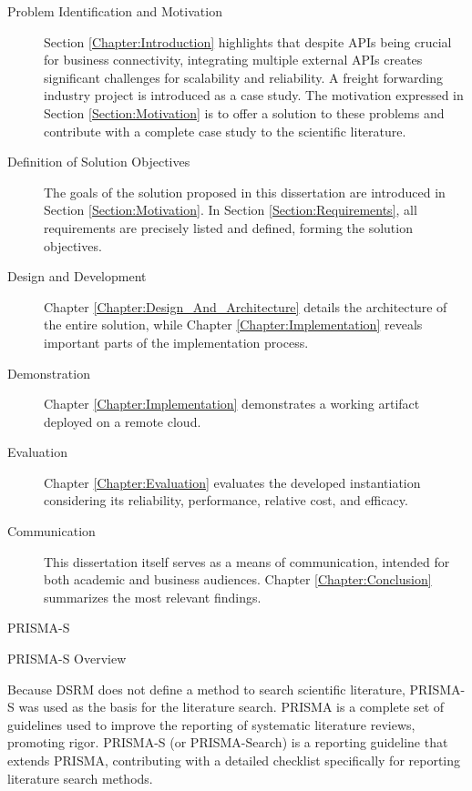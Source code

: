\documentclass[12pt, reqno, oneside]{amsbook}
\makeatletter
\def\section{\@startsection{section}{1}%
      \z@{.5\linespacing\@plus.7\linespacing}{.25\linespacing}%
      {\normalfont\bfseries\flushleft}}
\def\subsection{\@startsection{subsection}{2}%
      \z@{.5\linespacing\@plus.7\linespacing}{.25\linespacing}%
      {\normalfont\bfseries\flushleft}}
\theoremstyle{definition}
\theoremstyle{definition}
\numberwithin{section}{chapter}
\numberwithin{table}{chapter}
\numberwithin{figure}{chapter}
\makeatother
\begin{document}
\begin{description}
  \item [Problem Identification and Motivation] Section \ref{Chapter:Introduction} highlights that despite \acp{API} being crucial for business connectivity, integrating multiple external \acp{API} creates significant challenges for scalability and reliability. A freight forwarding industry project is introduced as a case study. The motivation expressed in Section \ref{Section:Motivation} is to offer a solution to these problems and contribute with a complete case study to the scientific literature.
  \item [Definition of Solution Objectives] The goals of the solution proposed in this dissertation are introduced in Section \ref{Section:Motivation}. In Section \ref{Section:Requirements}, all requirements are precisely listed and defined, forming the solution objectives.
  \item [Design and Development] Chapter \ref{Chapter:Design_And_Architecture} details the architecture of the entire solution, while Chapter \ref{Chapter:Implementation} reveals important parts of the implementation process.
  \item [Demonstration] Chapter \ref{Chapter:Implementation} demonstrates a working artifact deployed on a remote cloud.
  \item [Evaluation] Chapter \ref{Chapter:Evaluation} evaluates the developed instantiation considering its reliability, performance, relative cost, and efficacy.
  \item [Communication] This dissertation itself serves as a means of communication, intended for both academic and business audiences. Chapter \ref{Chapter:Conclusion} summarizes the most relevant findings.
\end{description}

\section{PRISMA-S}

\subsection{PRISMA-S Overview}
\label{Subsection:PRISMA_S_Overview}

Because \ac{DSRM} does not define a method to search scientific literature, PRISMA-S was used as the basis for the literature search. \ac{PRISMA} is a complete set of guidelines used to improve the reporting of systematic literature reviews, promoting rigor. PRISMA-S (or PRISMA-Search) is a reporting guideline that extends PRISMA, contributing with a detailed checklist specifically for reporting literature search methods.
\end{document}
